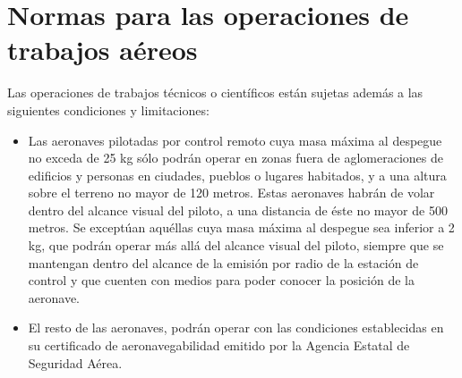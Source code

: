 \section{Normas para las operaciones de trabajos aéreos}

Las operaciones de trabajos técnicos o científicos están sujetas además a las siguientes condiciones y limitaciones:
\begin{itemize}
\item Las aeronaves pilotadas por control remoto cuya masa máxima al despegue no exceda de 25 kg sólo podrán operar en zonas fuera de aglomeraciones de edificios y personas en ciudades, pueblos o lugares habitados, y a una altura sobre el terreno no mayor de 120 metros. Estas aeronaves habrán de volar dentro del alcance visual del piloto, a una distancia de éste no mayor de 500 metros. Se exceptúan aquéllas cuya masa máxima al despegue sea inferior a 2 kg, que podrán operar más allá del alcance visual del piloto, siempre que se mantengan dentro del alcance de la emisión por radio de la estación de control y que cuenten con medios para poder conocer la posición de la aeronave.
\item El resto de las aeronaves, podrán operar con las condiciones establecidas en su certificado de aeronavegabilidad emitido por la Agencia Estatal de Seguridad Aérea.
\end{itemize}

